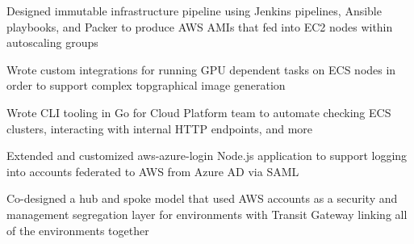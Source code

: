 \begin{cventries}
{\begin{cvitems}
        \item {Designed immutable infrastructure pipeline using Jenkins pipelines, Ansible playbooks, and Packer to produce AWS AMIs that fed into EC2 nodes within autoscaling groups}
        \item {Wrote custom integrations for running GPU dependent tasks on ECS nodes in order to support complex topgraphical image generation}
        \item {Wrote CLI tooling in Go for Cloud Platform team to automate checking ECS clusters, interacting with internal HTTP endpoints, and more}
        \item {Extended and customized aws-azure-login Node.js application to support logging into accounts federated to AWS from Azure AD via SAML}
        \item {Co-designed a hub and spoke model that used AWS accounts as a security and management segregation layer for environments with Transit Gateway linking all of the environments together}
      \end{cvitems}
    }



\end{cventries}
